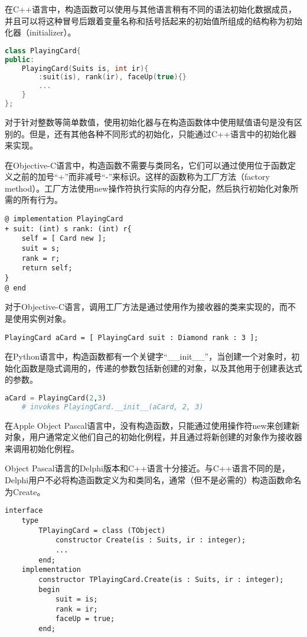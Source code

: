 在C++语言中，构造函数可以使用与其他语言稍有不同的语法初始化数据成员，并且可以将这种冒号后跟着变量名称和括号括起来的初始值所组成的结构称为初始化器（initializer）。


\begin{lstlisting}[language=C++]
class PlayingCard{
public:
	PlayingCard(Suits is, int ir){
		:suit(is), rank(ir), faceUp(true){}
		...
	}
};
\end{lstlisting}

对于针对整数等简单数值，使用初始化器与在构造函数体中使用赋值语句是没有区别的。但是，还有其他各种不同形式的初始化，只能通过C++语言中的初始化器来实现。

在Objective-C语言中，构造函数不需要与类同名，它们可以通过使用位于函数定义之前的加号“+”而非减号“-”来标识。这样的函数称为工厂方法（factory method）。工厂方法使用new操作符执行实际的内存分配，然后执行初始化对象所需的所有行为。

\begin{lstlisting}[language={[Objective]C}]
@ implementation PlayingCard
+ suit: (int) s rank: (int) r{
	self = [ Card new ];
	suit = s;
	rank = r;
	return self;
} 
@ end
\end{lstlisting}

对于Objective-C语言，调用工厂方法是通过使用作为接收器的类来实现的，而不是使用实例对象。

\begin{lstlisting}[language={[Objective]C}]
PlayingCard aCard = [ PlayingCard suit : Diamond rank : 3 ];
\end{lstlisting}

在Python语言中，构造函数都有一个关键字“\_\_init\_\_”，当创建一个对象时，初始化函数是隐式调用的，传递的参数包括新创建的对象，以及其他用于创建表达式的参数。

\begin{lstlisting}[language=Python]
aCard = PlayingCard(2,3)
	# invokes PlayingCard.__init__(aCard, 2, 3)
\end{lstlisting}

在Apple Object Pascal语言中，没有构造函数，只能通过使用操作符new来创建新对象，用户通常定义他们自己的初始化例程，并且通过将新创建的对象作为接收器来调用初始化例程。

Object Pascal语言的Delphi版本和C++语言十分接近。与C++语言不同的是，Delphi用户不必将构造函数定义为和类同名，通常（但不是必需的）构造函数命名为Create。

\begin{lstlisting}[language=Delphi]
interface
	type
		TPlayingCard = class (TObject)
			constructor Create(is : Suits, ir : integer);
			...
		end;
	implementation
		constructor TPlayingCard.Create(is : Suits, ir : integer);
		begin
			suit = is;
			rank = ir;
			faceUp = true;
		end;
\end{lstlisting}

